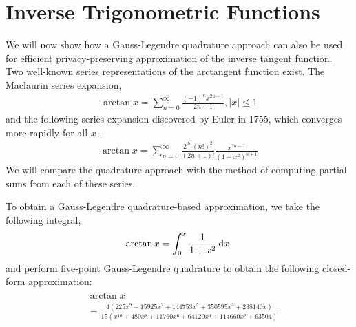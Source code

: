 \section{Inverse Trigonometric Functions}
We will now show how a Gauss-Legendre quadrature approach can also be used for efficient privacy-preserving approximation of the inverse tangent function. Two well-known series representations of the arctangent function exist. The Maclaurin series expansion,
\begin{align} \label{eq:arctan_maclaurin}
	\arctan x = \sum_{n=0}^{\infty}{\frac{(-1)^nx^{2n+1}}{2n+1}}, |x|\leq 1
\end{align}
and the following series expansion discovered by Euler in 1755, which converges more rapidly for all $x$ \cite{chien-lih_89.67_2005}.
\begin{align} \label{eq:arctan_euler}
	\arctan x = \sum_{n=0}^{\infty}
	{
	\frac
		{2^{2n}(n!)^2}
		{(2n+1)!}
	\frac
		{x^{2n+1}}
		{(1+x^2)^{n+1}}
	}
\end{align}
We will compare the quadrature approach with the method of computing partial sums from each of these series.

To obtain a Gauss-Legendre quadrature-based approximation, we take the following integral,
\begin{align*}
	\arctan x = \int_0^x{\frac{1}{1+x^2}\mathop{}\!\mathrm{d} x},
\end{align*}
and perform five-point Gauss-Legendre quadrature to obtain the following closed-form approximation:
\begin{align} \label{eq:arctan_quadrature}
	\begin{split}
		&\arctan x \\
		&= \frac
		{4(225x^9 + 15925x^7 + 144753x^5 + 350595x^3 + 238140x)}
		{15(x^{10} + 480x^8 + 11760x^6 + 64120x^4 + 114660x^2 + 63504)}
	\end{split}
\end{align}


